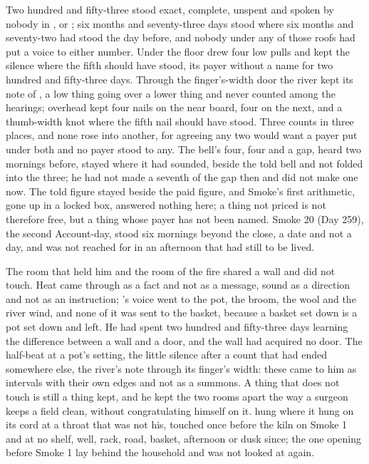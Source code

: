 Two hundred and fifty-three stood exact, complete, unspent and spoken by nobody in ,  or ; six months and seventy-three days stood where six months and seventy-two had stood the day before, and nobody under any of those roofs had put a voice to either number. Under the floor  drew four low pulls and kept the silence where the fifth should have stood, its payer without a name for two hundred and fifty-three days. Through the finger's-width door the river kept its note of , a low thing going over a lower thing and never counted among the hearings; overhead  kept four nails on the near board, four on the next, and a thumb-width knot where the fifth nail should have stood. Three counts in three places, and none rose into another, for agreeing any two would want a payer put under both and no payer stood to any. The bell's four, four and a gap, heard two mornings before, stayed where it had sounded, beside the told bell and not folded into the three; he had not made a seventh of the gap then and did not make one now. The told figure stayed beside the paid figure, and Smoke's first arithmetic, gone up  in a locked box, answered nothing here; a thing not priced is not therefore free, but a thing whose payer has not been named. Smoke 20 (Day 259), the second Account-day, stood six mornings beyond the close, a date and not a day, and was not reached for in an afternoon that had still to be lived.

The room that held him and the room of the fire shared a wall and did not touch. Heat came through as a fact and not as a message, sound as a direction and not as an instruction; 's voice went to the pot, the broom, the wool and the river wind, and none of it was sent to the basket, because a basket set down is a pot set down and left. He had spent two hundred and fifty-three days learning the difference between a wall and a door, and the wall had acquired no door. The half-beat at a pot's setting, the little silence after a count that had ended somewhere else, the river's note through its finger's width: these came to him as intervals with their own edges and not as a summons. A thing that does not touch is still a thing kept, and he kept the two rooms apart the way a surgeon keeps a field clean, without congratulating himself on it.  hung where it hung on its cord at a throat that was not his, touched once before the kiln on Smoke 1 and at no shelf, well, rack, road, basket, afternoon or dusk since; the one opening before Smoke 1 lay behind the household and was not looked at again.

